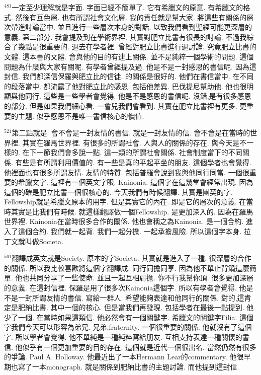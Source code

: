 \documentclass{book}
\begin{document}
$^{481}$一定至少理解就是字面.
字面已經不簡單了.
它有希臘文的原意.
有希臘文的格式.
然後有互色層.
也有所謂社會文化層.
我的責任就是幫大家.
將這些有關係的層次帶進討論當中.
並且進行一些層次本身的對話.
以致我們看到聖經可能更深層的意義.
第二部分.
我會提及到在學術界裡.
其實對肥立比書有很長的討論.
不過我綜合了幾點是很重要的.
過去在學者裡.
曾經對肥立比書進行過討論.
究竟肥立比書的文體.
這本書的文體.
會與他的目的有連上關係.
並不是純粹一個學術的問題.
這個問題為什麼與大家有關呢.
有學者曾經提及過.
他是不是一封感恩的書信呢.
因為這封信.
我們都深信保羅與肥立比的信徒.
的關係是很好的.
他們在書信當中.
在不同的段落當中.
都流露了他對肥立比的感恩.
包括他差異.
巴伐提尼幫助他.
他也很明顯與他同行.
這些是一些學者會覺得.
他是不是感恩的書信呢.
沒錯,是有很多感恩的部分.
但是如果我們細心看.
一會兒我們會看到.
其實在肥立比書裡有更多.
更重要的主題.
似乎感恩不是唯一書信核心的價值.

$^{521}$第二點就是.
會不會是一封友情的書信.
就是一封友情的信.
會不會是在當時的世界裡.
其實在羅馬世界裡.
有很多的所謂社會.
人與人的關係的存在.
與今天是不一樣的.
在下一節我們會多說一點.
這一類的所謂社會關係.
社會制度當下的不同關係.
有些是有所謂利用價值的.
有一些是真的平起平坐的朋友.
這個學者也會覺得.
他裡面也有很多所謂友情.
友情的特質.
包括普羅會說到我與他同行同當.
一個很重要的希臘文字.
這裡有一個英文字眼.
Kainonia.
這個字在這幾堂會經常出現.
因為這個的確是肥立比書一個很核心的.
今天我們有時候翻譯.
其實是團契的字.
Fellowship就是希臘文原本的用字.
但是其實它的內在.
即是它的層次的意義.
在當時其實是比我們有時候.
就這樣翻譯做一個Fellowship.
是更加深入的.
因為在羅馬世界裡.
Kainonia在當時很多合作的關係.
他也會稱之為Kainonia.
是一個合約.
進入了這個合約.
我們就一起背.
我們一起分擔.
一起承擔風險.
所以這個字本身.
拉丁文就叫做Societa.

$^{561}$翻譯成英文就是Society.
原本的字Societa.
其實就是進入了一種.
很深層的合作的關係.
所以我比較喜歡將這個字翻譯成.
同行同擔同享.
因為他不單止背鍋這麼簡單.
他也共同分享了一些使命.
並且一起互相肩擔.
你不行我幫你頂.
很多更加深層的意義.
在這封信裡.
保羅是用了很多次Kainonia這個字.
所以有學者會覺得.
他是不是一封所謂友情的書信.
寫給一群人.
希望能夠表達和他同行的關係.
對的,這肯定是肥納比書.
其中一個的核心.
但是當我們再發現.
包括學者在最後一點提到.
他少了一個.
在當時如果這類信.
他必然會有一個關鍵字.
希臘文的關鍵字Filia.
這個字我們今天可以形容為弟兄.
兄弟,fraternity.
一個很重要的關係.
他就沒有了這個字.
所以學者會覺得.
他不單純是一種純粹寫給朋友.
互相支持表達一種關懷的書信.
他似乎有一個更加重要的目的存在.
這個就是近代一個很出名.
當然仍然有很多的爭論.
Paul A. Holloway.
他最近出了一本Hermann Lear的commentary.
他很早期也寫了一本monograph.
就是關係到肥納比書的主題討論.
而他提到這封信.
\end{document}
